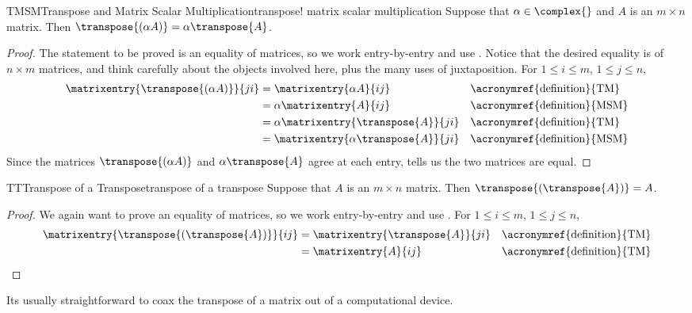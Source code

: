 %
\begin{theorem}{TMSM}{Transpose and Matrix Scalar Multiplication}{transpose! matrix scalar multiplication}
Suppose that $\alpha\in\complex{\null}$ and $A$ is an $m\times n$ matrix.  Then $\transpose{(\alpha A)}=\alpha\transpose{A}$.
%
\end{theorem}
%
\begin{proof}
The statement  to be proved is an equality of matrices, so we work entry-by-entry and use .  Notice that the desired equality is of $n\times m$ matrices, and think carefully about the objects involved here, plus the many uses of juxtaposition.  For $1\leq i\leq m$, $1\leq j\leq n$,
%
\begin{align*}
\matrixentry{\transpose{(\alpha A)}}{ji}&=
\matrixentry{\alpha A}{ij}&&\text{\acronymref{definition}{TM}}\\
&=\alpha\matrixentry{A}{ij}&&\text{\acronymref{definition}{MSM}}\\
&=\alpha\matrixentry{\transpose{A}}{ji}&&\text{\acronymref{definition}{TM}}\\
&=\matrixentry{\alpha\transpose{A}}{ji}&&\text{\acronymref{definition}{MSM}}
\end{align*}
%
Since the matrices $\transpose{(\alpha A)}$ and $\alpha\transpose{A}$ agree at each entry,  tells us the two matrices are equal.
%
\end{proof}
%
\begin{theorem}{TT}{Transpose of a Transpose}{transpose of a transpose}
Suppose that $A$ is an $m\times n$ matrix.  Then $\transpose{\left(\transpose{A}\right)}=A$.
%
\end{theorem}
%
\begin{proof}
We again want to prove an equality of matrices, so we work entry-by-entry and use .  For $1\leq i\leq m$, $1\leq j\leq n$,
%
\begin{align*}
%
\matrixentry{\transpose{\left(\transpose{A}\right)}}{ij}
&=\matrixentry{\transpose{A}}{ji}&&\text{\acronymref{definition}{TM}}\\
&=\matrixentry{A}{ij}&&\text{\acronymref{definition}{TM}}
%
\end{align*}
%
\end{proof}
%
{Its usually straightforward to coax the transpose of a matrix out of a computational device.}
{
{}{\relax}%
{}{\relax}%
{}{\relax}%
}{
%
%
%
}
